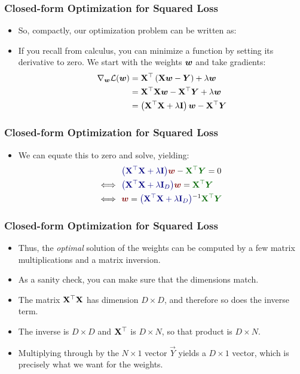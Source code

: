\documentclass[trans]{beamer}
\begin{document}
\begin{frame}
  \frametitle{Closed-form Optimization for Squared Loss}
\begin{itemize}
\item 
%
So, compactly, our optimization problem can be written as:
%
%
\item If you recall from calculus, you can minimize a function by setting
its derivative to zero.  We start with the weights ${\boldsymbol{w}}$ and take
gradients:
%
\begin{align}
\nabla_{\boldsymbol{w}} \mathcal{L}({\boldsymbol{w}})
&= \text{\bf X} {}^\top \left( \text{\bf X} {\boldsymbol{w}} - \boldsymbol{Y} \right) + \lambda {\boldsymbol{w}} \\
&= \text{\bf X} {}^\top \text{\bf X} {\boldsymbol{w}} - \text{\bf X} {}^\top \boldsymbol{Y} + \lambda {\boldsymbol{w}} \\
&= \left( \text{\bf X} {}^\top \text{\bf X} + \lambda \mathbf{I} \right) {\boldsymbol{w}} - \text{\bf X} {}^\top \boldsymbol{Y}
\end{align}
%
\end{itemize}
\end{frame}

\begin{frame}
  \frametitle{Closed-form Optimization for Squared Loss}
\begin{itemize}
\item We can equate this to zero and solve, yielding:
%
\begin{align}
     & \textcolor{darkblue}{\left( \mat X \T \mat X + \la \eye \right)} \textcolor{darkred}{\vw} - \textcolor{darkergreen}{\mat X \T \vec Y} = 0\\
\myiff~~ & \textcolor{darkblue}{\left( \mat X \T \mat X + \la \eye_D \right)} \textcolor{darkred}{\vw} = \textcolor{darkergreen}{\mat X \T \vec Y} \\
\myiff~~ & \textcolor{darkred}{\vw} = \textcolor{darkblue}{\left( \mat X \T \mat X + \la \eye_D \right)}\inv \textcolor{darkergreen}{\mat X \T \vec Y}
\end{align}
%
\end{itemize}
\end{frame}

\begin{frame}
  \frametitle{Closed-form Optimization for Squared Loss}
\begin{itemize}
\item Thus, the \emph{optimal} solution of the weights can be computed by a
few matrix multiplications and a matrix inversion.
%
\item As a sanity check, you can make sure that the dimensions match.
\item  The
matrix $\text{\bf X}{}^\top\text{\bf X}$ has dimension $D\times D$, and therefore so
does the inverse term.  
\item The inverse is $D\times D$ and $\text{\bf X}{}^\top$ is
$D\times N$, so that product is $D\times N$.  
\item Multiplying through by
the $N\times 1$ vector $\vec Y$ yields a $D \times 1$ vector, which is
precisely what we want for the weights.
\end{itemize}
\end{frame}
\end{document}

